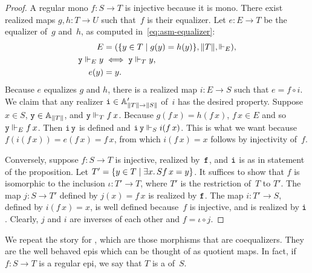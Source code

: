 \begin{proof}
  A regular mono $f : S \to T$ is injective because it is
  mono. There exist realized maps $g, h : T \to U$ such
  that~$f$ is their equalizer. Let $e : E \to T$ be the
  equalizer of~$g$ and~$h$, as computed in~\eqref{eq:asm-equalizer}:
  \begin{align*}
    E &= (\set{y \in T \such g(y) = h(y)}, \T{T}, {\rz[E]}), \\
    \R{y} \rz[E] y &\iff \R{y} \rz[T] y, \\
    e(y) &= y.
  \end{align*}
  Because $e$ equalizes $g$ and $h$, there is a realized map $i :
  E \to S$ such that $e = f \circ i$. We claim that any
  realizer $\R{i} \in \subAtyp{\T{T} \to \T{S}}$ of~$i$ has the desired
  property. Suppose $x \in S$, $\R{y} \in \Atyp{\T{T}}$, and $\R{y}
  \rz[T] f\,x$. Because $g(f\,x) = h(f\,x)$, $f\,x \in E$ and so $\R{y}
  \rz[E] f\,x$. Then $\R{i}\,\R{y}$ is defined and $\R{i}\,\R{y} \rz[S]
  i(f\,x)$. This is what we want because $f(i(f\,x)) = e(f\,x) =
  f\,x$, from which $i(f\,x) = x$ follows by injectivity of~$f$.

  Conversely, suppose $f : S \to T$ is injective, realized
  by~$\R{f}$, and $\R{i}$ is as in statement of the proposition. Let
  $T' = \set{y \in T \such \some{x}{S}{f\,x = y}}$. It suffices to
  show that $f$ is isomorphic to the inclusion $\iota : T' \to
  T$, where $T'$ is the restriction of~$T$ to $T'$.
  The map $j : S \to T'$ defined by $j(x) = f\,x$ is
  realized by $\R{f}$. The map $i : T' \to S$, defined by
  $i(f\,x) = x$, is well defined because~$f$ is injective, and is
  realized by $\R{i}$. Clearly, $j$ and $i$ are inverses of each other
  and $f = \iota \circ j$.
\end{proof}


We repeat the story for , which are those morphisms
that are coequalizers. They are the well behaved epis which can be
thought of as quotient maps. In fact, if $f : S \to T$ is
a regular epi, we say that $T$ is a  of~$S$.

